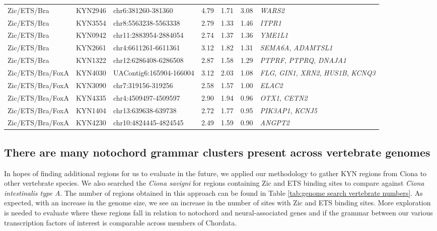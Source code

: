 \begin{small}
\begin{landscape}
\begin{longtable}{l l p{} p{} p{} p{} p{}}
            Zic/ETS/Bra & KYN2946 & chr6:381260-381360 & 4.79 & 1.71 & 3.08 & \textit{WARS2} \\
            Zic/ETS/Bra & KYN3554 & chr8:5563238-5563338 & 2.79 & 1.33 & 1.46 & \textit{ITPR1} \\
            Zic/ETS/Bra & KYN0942 & chr11:2883954-2884054 & 2.74 & 1.37 & 1.36 & \textit{YME1L1} \\
            Zic/ETS/Bra & KYN2661 & chr4:6611261-6611361 & 3.12 & 1.82 & 1.31 & \textit{SEMA6A}, \textit{ADAMTSL1} \\
            Zic/ETS/Bra & KYN1322 & chr12:6286408-6286508 & 2.87 & 1.58 & 1.29 & \textit{PTPRF}, \textit{PTPRQ}, \textit{DNAJA1} \\

            Zic/ETS/Bra/FoxA & KYN4030 & UAContig6:165904-166004 & 3.12 & 2.03 & 1.08 & \textit{FLG}, \textit{GIN1}, \textit{XRN2}, \textit{HUS1B}, \textit{KCNQ3} \\
            Zic/ETS/Bra/FoxA & KYN3090 & chr7:319156-319256 & 2.58 & 1.57 & 1.00 & \textit{ELAC2} \\
            Zic/ETS/Bra/FoxA & KYN4335 & chr4:4509497-4509597 & 2.90 & 1.94 & 0.96 & \textit{OTX1}, \textit{CETN2} \\
            Zic/ETS/Bra/FoxA & KYN1404 & chr13:639638-639738 & 2.72 & 1.77 & 0.95 & \textit{PIK3AP1}, \textit{KCNJ5} \\
            Zic/ETS/Bra/FoxA & KYN4230 & chr10:4824445-4824545 & 2.49 & 1.59 & 0.90 & \textit{ANGPT2} \\
        \end{longtable}
    \end{landscape}
\end{small}

\subsection{There are many notochord grammar clusters present across vertebrate genomes}

In hopes of finding additional regions for us to evaluate in the future, we applied our methodology to gather KYN regions from Ciona to other vertebrate species. We also searched the \textit{Ciona savigni} for regions containing Zic and ETS binding sites to compare against \textit{Ciona intestinalis type A}. The number of regions obtained in this approach can be found in Table \ref{tab:genome search vertebrate numbers}. As expected, with an increase in the genome size, we see an increase in the number of sites with Zic and ETS binding sites. More exploration is needed to evaluate where these regions fall in relation to notochord and neural-associated genes and if the grammar between our various transcription factors of interest is comparable across members of Chordata. 

